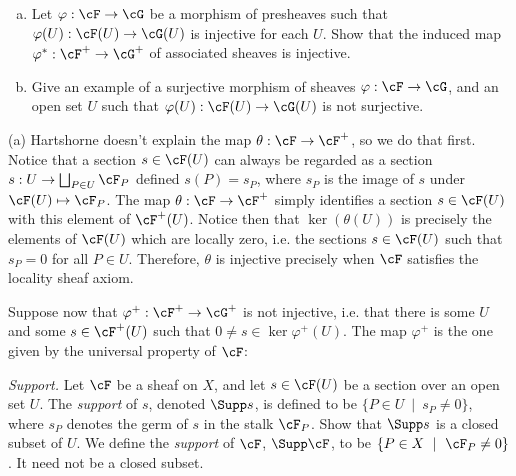\begin{homework}[e]
	$ $
	\begin{enumerate}[(a)]

		\item Let $\varphi:\cF\to \cG$ be a morphism of presheaves such that $\varphi(U):\cF(U)\to \cG(U)$ is injective for each $U$. Show that the induced map $\varphi^*:\cF^+\to \cG^+$ of associated sheaves is injective.

		\item Give an example of a surjective morphism of sheaves $\varphi:\cF\to \cG$, and an open set $U$ such that $\varphi(U):\cF(U)\to \cG(U)$ is not surjective. 
	\end{enumerate}
    \begin{prf}
    	\noindent (a) \hspace{1em} Hartshorne doesn't explain the map $\theta:\cF\to \cF^+$, so we do that first. Notice that a section $s \in \cF(U)$ can always be regarded as a section $s:U\to \bigsqcup_{P\in U}\cF_P$ defined $s(P) = s_P$, where $s_P$ is the image of $s$ under $\cF(U) \mapsto \cF_P$. The map $\theta:\cF\to \cF^+$ simply identifies a section $s \in \cF(U)$ with this element of $\cF^+(U)$. Notice then that $\ker(\theta(U))$ is precisely the elements of $\cF(U)$ which are locally zero, i.e. the sections $s \in \cF(U)$ such that $s_P = 0$ for all $P \in U$. Therefore, $\theta$ is injective precisely when $\cF$ satisfies the locality sheaf axiom.

		Suppose now that $\varphi^+:\cF^+\to \cG^+$ is not injective, i.e. that there is some $U$ and some $s \in \cF^+(U)$ such that $0 \neq s \in \ker \varphi^+(U)$. The map $\varphi^+$ is the one given by the universal property of $\cF$:
		\begin{center}
		\end{center}
    \end{prf}
	 \textit{Support.} Let $\cF$ be a sheaf on $X$, and let $s \in \cF(U)$ be a section over an open set $U$. The \textit{support} of $s$, denoted $\Supp s$, is defined to be $\{P\in U ~ \mid~ s_P \neq 0\}$, where $s_P$ denotes the germ of $s$ in the stalk $\cF_P$. Show that $\Supp s$ is a closed subset of $U$. We define the \textit{support} of $\cF$, $\Supp \cF$, to be $\{P\in X~\mid~ \cF_P \neq 0\}$. It need not be a closed subset.


\end{homework}
